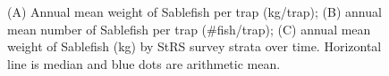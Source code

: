 \documentclass[12pt]{article}\usepackage[]{graphicx}\usepackage[]{color}
\begin{document}
\begin{figure}[htb]

{\centering {} 

}

\caption{(A) Annual mean weight of Sablefish per trap (kg/trap); (B) annual mean number of Sablefish per trap (\#fish/trap); (C) annual mean weight of Sablefish (kg) by StRS survey strata over time. Horizontal line is median and blue dots are arithmetic mean.}\label{fig:figure9}
\end{figure}
\clearpage
\end{document}
